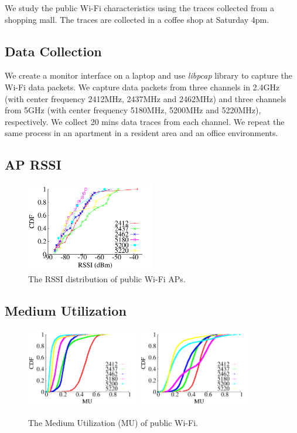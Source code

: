 

We study the public Wi-Fi characteristics using the traces collected 
from a shopping mall. 
The traces are collected in a coffee shop at Saturday 4pm. 

\subsection{Data Collection}

We create a monitor interface on a laptop and use \emph{libpcap}
library to capture the Wi-Fi data packets. 
We capture data packets from three channels in 2.4GHz 
(with center frequency 2412MHz, 2437MHz and 2462MHz) and
three channels from 5GHz (with center frequency 5180MHz, 5200MHz and 5220MHz), respectively. 
We collect 20 mins data traces from each channel. 
We repeat the same process in an apartment in a 
resident area and an office environments. 

\subsection{AP RSSI}

\begin{figure}[!ht]
 \centering
    \includegraphics[width=0.5\textwidth]{./figures/public_ap_rssi}
 \caption{The RSSI distribution of public Wi-Fi APs.}
  \label{fig:public_ap_rssi}
\end{figure}



\subsection{Medium Utilization}

\begin{figure}[!ht]
 \centering
    \includegraphics[width=0.44\textwidth]{./figures/public_mu_raw}
    \includegraphics[width=0.44\textwidth]{./figures/public_mu_estimated}
 \caption{The Medium Utilization (MU) of public Wi-Fi.}
  \label{fig:public_mu}
\end{figure}




